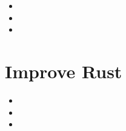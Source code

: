 \documentclass[xcolor={svgnames},hyperref]{beamer}
\begin{document}
    \begin{frame}
        \begin{itemize}
            \item
            \item
            \item
        \end{itemize}
    \end{frame}


\section{Improve Rust}



    \begin{frame}
        \begin{itemize}
            \item
            \item
            \item
        \end{itemize}
    \end{frame}
\end{document}
